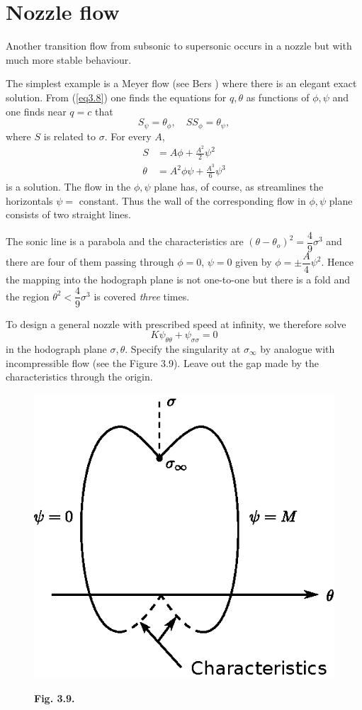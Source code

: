 \section{Nozzle flow}\label{chap3:sec3.13}
Another transition flow from subsonic to supersonic occurs in a nozzle but with much more stable behaviour.

The simplest example is a Meyer flow (see Bers \cite{key2}) where there is an elegant exact solution. From (\ref{eq3.8}) one finds the equations for $q,\theta$ as functions of $\phi,\psi$ and one finds near $q=c$ that
$$
S_\psi = \theta_\phi, \quad SS_\phi = \theta_\psi,
$$
where $S$ is related to $\sigma$. For every $A$,
\begin{align*}
S & = A \phi + \frac{A^2}{2}  \psi^2\\
\theta & = A^2 \phi \psi + \frac{A^3}{6} \psi^3
\end{align*}\pageoriginale
is a solution. The flow in the $\phi, \psi$ plane has, of course, as streamlines the horizontals $\psi = $ constant. Thus the wall of the corresponding flow in $\phi, \psi$ plane consists of two straight lines.

The sonic line is a parabola and the characteristics are $(\theta - \theta_o)^2 = \dfrac{4}{9} \sigma^3$ and there are four of them passing through $\phi =0$, $\psi =0$ given by $\phi = \pm \dfrac{A}{4} \psi^2$. Hence the mapping into the hodograph plane is not one-to-one but there is a fold and the region $\theta^2 < \dfrac{4}{9} \sigma^3$ is covered {\em three} times.

To design a general nozzle with prescribed speed at infinity, we therefore solve
$$
K\psi_{\theta \theta} + \psi_{\sigma\sigma} =0
$$
in the hodograph plane $\sigma, \theta$. Specify the singularity at $\sigma_\infty$ by analogue with incompressible flow (see the Figure 3.9). Leave out the gap made by the characteristics through the origin.
\begin{figure}[H]
\centering
\includegraphics{figures/fig3.9.eps}
\centerline{\bf Fig. 3.9.}
\end{figure}


